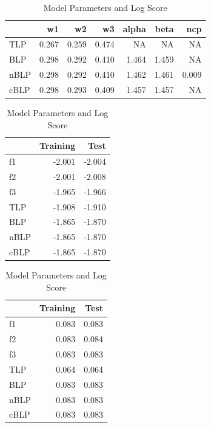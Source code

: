 \documentclass[]{article}
\begin{document}
\begin{table}[!h]
\caption{\label{tab:unnamed-chunk-3}Model Parameters and Log Score}

\centering
\begin{tabular}[t]{lrrrrrr}
\toprule
  & w1 & w2 & w3 & alpha & beta & ncp\\
\midrule
\rowcolor{gray!6}  TLP & 0.267 & 0.259 & 0.474 & NA & NA & NA\\
BLP & 0.298 & 0.292 & 0.410 & 1.464 & 1.459 & NA\\
\rowcolor{gray!6}  nBLP & 0.298 & 0.292 & 0.410 & 1.462 & 1.461 & 0.009\\
cBLP & 0.298 & 0.293 & 0.409 & 1.457 & 1.457 & NA\\
\bottomrule
\end{tabular}
\centering
\begin{tabular}[t]{lrr}
\toprule
\rowcolor{gray!6}    & Training & \vphantom{1} Test\\
\midrule
f1 & -2.001 & -2.004\\
\rowcolor{gray!6}  f2 & -2.001 & -2.008\\
f3 & -1.965 & -1.966\\
\rowcolor{gray!6}  TLP & -1.908 & -1.910\\
BLP & -1.865 & -1.870\\
\addlinespace
\rowcolor{gray!6}  nBLP & -1.865 & -1.870\\
cBLP & -1.865 & -1.870\\
\bottomrule
\end{tabular}
\centering
\begin{tabular}[t]{lrr}
\toprule
\rowcolor{gray!6}    & Training & Test\\
\midrule
f1 & 0.083 & 0.083\\
\rowcolor{gray!6}  f2 & 0.083 & 0.084\\
f3 & 0.083 & 0.083\\
\rowcolor{gray!6}  TLP & 0.064 & 0.064\\
BLP & 0.083 & 0.083\\
\addlinespace
\rowcolor{gray!6}  nBLP & 0.083 & 0.083\\
cBLP & 0.083 & 0.083\\
\bottomrule
\end{tabular}
\end{table}
\end{document}
